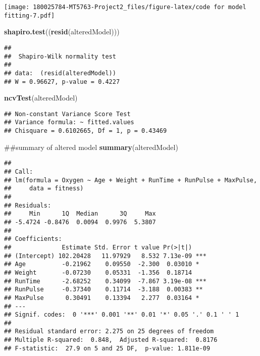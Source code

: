 \documentclass[]{article}
\newenvironment{Shaded}{\begin{snugshade}}{\end{snugshade}}
\newcommand{\KeywordTok}[1]{\textcolor[rgb]{0.13,0.29,0.53}{\textbf{#1}}}
\newcommand{\NormalTok}[1]{#1}
\begin{document}
\texttt{[image: 180025784-MT5763-Project2\_files/figure-latex/code for model fitting-7.pdf]}

\begin{Shaded}
\begin{Highlighting}[]
\KeywordTok{shapiro.test}\NormalTok{((}\KeywordTok{resid}\NormalTok{(alteredModel)))}
\end{Highlighting}
\end{Shaded}

\begin{verbatim}
## 
##  Shapiro-Wilk normality test
## 
## data:  (resid(alteredModel))
## W = 0.96627, p-value = 0.4227
\end{verbatim}

\begin{Shaded}
\begin{Highlighting}[]
\KeywordTok{ncvTest}\NormalTok{(alteredModel)}
\end{Highlighting}
\end{Shaded}

\begin{verbatim}
## Non-constant Variance Score Test 
## Variance formula: ~ fitted.values 
## Chisquare = 0.6102665, Df = 1, p = 0.43469
\end{verbatim}

\begin{Shaded}
\begin{Highlighting}[]
\NormalTok{##summary of altered model}
\KeywordTok{summary}\NormalTok{(alteredModel)}
\end{Highlighting}
\end{Shaded}

\begin{verbatim}
## 
## Call:
## lm(formula = Oxygen ~ Age + Weight + RunTime + RunPulse + MaxPulse, 
##     data = fitness)
## 
## Residuals:
##     Min      1Q  Median      3Q     Max 
## -5.4724 -0.8476  0.0094  0.9976  5.3807 
## 
## Coefficients:
##              Estimate Std. Error t value Pr(>|t|)    
## (Intercept) 102.20428   11.97929   8.532 7.13e-09 ***
## Age          -0.21962    0.09550  -2.300  0.03010 *  
## Weight       -0.07230    0.05331  -1.356  0.18714    
## RunTime      -2.68252    0.34099  -7.867 3.19e-08 ***
## RunPulse     -0.37340    0.11714  -3.188  0.00383 ** 
## MaxPulse      0.30491    0.13394   2.277  0.03164 *  
## ---
## Signif. codes:  0 '***' 0.001 '**' 0.01 '*' 0.05 '.' 0.1 ' ' 1
## 
## Residual standard error: 2.275 on 25 degrees of freedom
## Multiple R-squared:  0.848,  Adjusted R-squared:  0.8176 
## F-statistic:  27.9 on 5 and 25 DF,  p-value: 1.811e-09
\end{verbatim}
\end{document}
